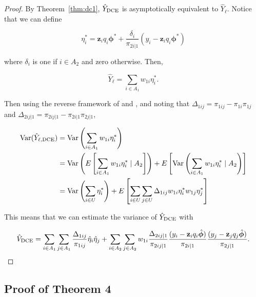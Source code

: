 \documentclass[12pt]{article}
\newcommand{\Var}{{\text{Var}}}
\renewcommand{\bf}[1]{\mathbf{#1}}
\begin{document}
\begin{proof}
  By Theorem~\ref{thm:dc1}, $\hat Y_{\rm DCE}$ is asymptotically equivalent to
  $\hat Y_{\ell}$. Notice that we can define

  $$
  \eta_i^* = 
  \bf z_i q_i \bm \phi^* + \frac{\delta_i}{\pi_{2i|1}}(y_i - \bf z_i q_i \bm \phi^*)
  $$

  where $\delta_i$ is one if $i \in A_2$ and zero otherwise. Then,

  $$
  \hat Y_{\ell} = \sum_{i \in A_1} w_{1i} \eta_i^*.
  $$

  Then using the reverse framework of \cite{fay1992inferences} and 
  \cite{shao1999variance}, and noting that 
  $\Delta_{1ij} = \pi_{1ij} - \pi_{1i}\pi_{1j}$ and 
  $\Delta_{2ij|1} = \pi_{2ij|1} - \pi_{2i|1}\pi_{2j|1}$,

  \begin{align*}
    \Var(\hat Y_{\ell, \rm{DCE}}) 
    &= \Var\left(\sum_{i \in A_1} w_{1i} \eta_i^*\right) \\
    &= \Var\left(E\left[\sum_{i \in A_1} w_{1i} \eta_i^* \mid A_2 \right]\right) 
    + E\left[\Var\left(\sum_{i \in A_1} w_{1i} \eta_i^* \mid A_2 \right)\right] \\
    &= \Var\left(\sum_{i \in U} \eta_i^*\right) 
    + E\left[\sum_{i \in U} \sum_{j \in U} \Delta_{1ij} w_{1i} \eta_i^* w_{1j}
      \eta_j^*\right]\\
  \end{align*}

  This means that we can estimate the variance of $\hat Y_{\rm DCE}$ with

  $$
  \hat V_{\rm DCE} 
  = \sum_{i \in A_1} \sum_{j \in A_1} \frac{\Delta_{1ij}}{\pi_{1ij}} 
  \hat \eta_i \hat \eta_j
  + \sum_{i \in A_2} \sum_{j \in A_2} w_{1i} \frac{\Delta_{2ij|1}}{\pi_{2ij|1}} 
  \frac{(y_i - \bf z_i q_i \hat{\bm \phi})}{\pi_{2i|1}}
  \frac{(y_j - \bf z_j q_j \hat{\bm \phi})}{\pi_{2j|1}}.
  $$

\end{proof}

\subsection{Proof of Theorem 4}
\end{document}
